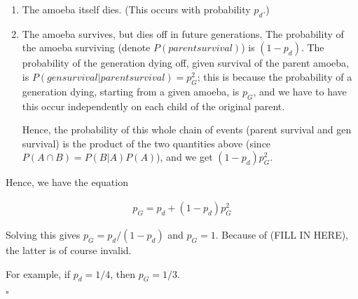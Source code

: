 \begin{enumerate}
\item The amoeba itself dies. (This occurs with probability $p_d$.)
\item The amoeba survives, but dies off in future generations. The probability of the amoeba surviving (denote $P(parent survival)$) is $(1 - p_d)$. The probability of the generation dying off, given survival of the parent amoeba, is $P(gen survival | parent survival) = p_G^2$; this is because the probability of a generation dying, starting from a given amoeba, is $p_G$, and we have to have this occur independently on each child of the original parent. 

Hence, the probability of this whole chain of events (parent survival and gen survival) is the product of the two quantities above (since $P(A \cap B) = P(B | A)P(A)$), and we get $(1-p_d)p_G^2$. 
\end{enumerate}

Hence, we have the equation

\begin{align*}
p_G = p_d + (1-p_d)p_G^2
\end{align*}

Solving this gives $p_G = p_d / (1 - p_d)$ and $p_G = 1$. Because of (FILL IN HERE), the latter is of course invalid. 

For example, if $p_d = 1/4$, then $p_G = 1/3$. %

$\square$






